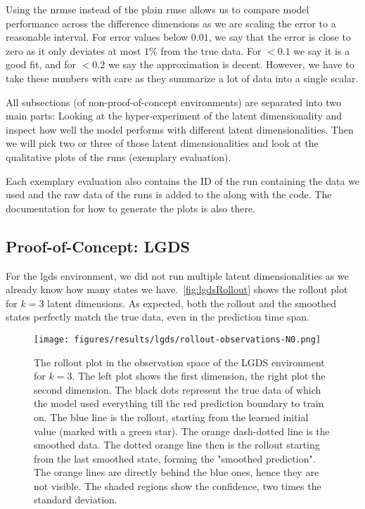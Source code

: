 	Using the \ac{nrmse} instead of the plain \ac{rmse} allows us to compare model performance across the difference dimensions as we are scaling the error to a reasonable interval. For error values below \( 0.01 \), we say that the error is close to zero as it only deviates at most \(1\%\) from the true data. For \(<0.1\) we say it is a good fit, and for \(<0.2\) we say the approximation is decent. However, we have to take these numbers with care as they summarize a lot of data into a single scalar.

	All subsections (of non-proof-of-concept environments) are separated into two main parts: Looking at the hyper-experiment of the latent dimensionality and inspect how well the model performs with different latent dimensionalities. Then we will pick two or three of those latent dimensionalities and look at the qualitative plots of the runs (exemplary evaluation).

	Each exemplary evaluation also contains the ID of the run containing the data we used and the raw data of the runs is added to the  along with the code. The documentation for how to generate the plots is also there.

	\subsection{Proof-of-Concept: LGDS}
		For the \ac{lgds} environment, we did not run multiple latent dimensionalities as we already know how many states we have.~\autoref{fig:lgdsRollout} shows the rollout plot for \( k = 3 \) latent dimensions. As expected, both the rollout and the smoothed states perfectly match the true data, even in the prediction time span.

		\begin{figure}
			\centering
			\texttt{[image: figures/results/lgds/rollout-observations-N0.png]}
			\caption[Rollout of the proof-of-concept LGDS experiment for 3 latent dimensions]{The rollout plot in the observation space of the LGDS environment for \(k = 3\). The left plot shows the first dimension, the right plot the second dimension. The black dots represent the true data of which the model used everything till the red prediction boundary to train on. The blue line is the rollout, starting from the learned initial value (marked with a green star). The orange dash-dotted line is the smoothed data. The dotted orange line then is the rollout starting from the last smoothed state, forming the "smoothed prediction". The orange lines are directly behind the blue ones, hence they are not visible. The shaded regions show the confidence, \ie two times the standard deviation.}
			\label{fig:lgdsRollout}
		\end{figure}

